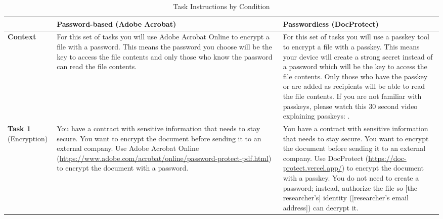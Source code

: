 \documentclass{article}
\begin{document}
\begin{table}[htbp]
    \centering
    \renewcommand{\arraystretch}{1.5} %
    \caption{Task Instructions by Condition}
    \label{tab:task-instructions}
    \small
    \begin{tabularx}{\textwidth}{
        >{\raggedright\arraybackslash}p{2.2cm} %
        >{\raggedright\arraybackslash}X        %
        >{\raggedright\arraybackslash}X        %
    }
        \toprule
        & \textbf{Password-based (Adobe Acrobat)} & \textbf{Passwordless (DocProtect)} \\
        \midrule
        
        \textbf{Context} & 
        For this set of tasks you will use Adobe Acrobat Online to encrypt a file with a password. This means the password you choose will be the key to access the file contents and only those who know the password can read the file contents. & 
        For this set of tasks you will use a passkey tool to encrypt a file with a passkey. This means your device will create a strong secret instead of a password which will be the key to access the file contents. Only those who have the passkey or are added as recipients will be able to read the file contents. If you are not familiar with passkeys, please watch this 30 second video explaining passkeys: . \\
        
        \midrule
        
        \textbf{Task 1} \newline (Encryption) & 
        You have a contract with sensitive information that needs to stay secure. You want to encrypt the document before sending it to an external company. Use Adobe Acrobat Online (\url{https://www.adobe.com/acrobat/online/password-protect-pdf.html}) to encrypt the document with a password. & 
        You have a contract with sensitive information that needs to stay secure. You want to encrypt the document before sending it to an external company. Use DocProtect (\url{https://doc-protect.vercel.app/}) to encrypt the document with a passkey. You do not need to create a password; instead, authorize the file so [the researcher's] identity ([researcher's email address]) can decrypt it. \\
        

\end{tabularx}
\end{table}
\end{document}
